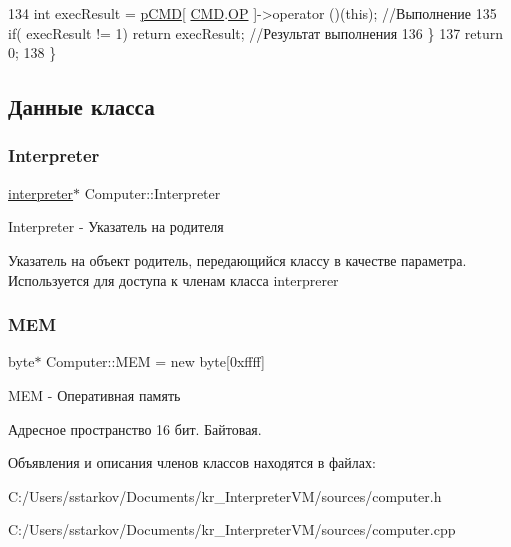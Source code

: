 \begin{DoxyCode}
134         \textcolor{keywordtype}{int} execResult = \hyperlink{class_computer_a297a9b79381a9f2005c574f09ea73d70}{pCMD}[ \hyperlink{class_computer_a8423168f7cc356b4dd36977603798caf}{CMD}.\hyperlink{struct_computer_1_1command_a2714eda12dcfba46770769c7ed9c7f0a}{OP} ]->operator ()(\textcolor{keyword}{this});     \textcolor{comment}{//Выполнение}
135         \textcolor{keywordflow}{if}( execResult != 1) \textcolor{keywordflow}{return} execResult;                 \textcolor{comment}{//Результат выполнения}
136     \}
137     \textcolor{keywordflow}{return} 0;
138 \}
\end{DoxyCode}


\subsection{Данные класса}
\hypertarget{class_computer_aa58d6e565412d6705657c0418b1e59fe}{}\label{class_computer_aa58d6e565412d6705657c0418b1e59fe} 
\subsubsection{\texorpdfstring{Interpreter}{Interpreter}}
{\footnotesize\ttfamily \hyperlink{classinterpreter}{interpreter}$\ast$ Computer\+::\+Interpreter\hspace{0.3cm}{\ttfamily [private]}}



Interpreter -\/ Указатель на родителя 

Указатель на объект родитель, передающийся классу в качестве параметра. Используется для доступа к членам класса interprerer \hypertarget{class_computer_adcd1bd438b7ad95f043db2acbbd864ae}{}\label{class_computer_adcd1bd438b7ad95f043db2acbbd864ae} 
\subsubsection{\texorpdfstring{M\+EM}{MEM}}
{\footnotesize\ttfamily byte$\ast$ Computer\+::\+M\+EM = new byte\mbox{[}0xffff\mbox{]}\hspace{0.3cm}{\ttfamily [private]}}



M\+EM -\/ Оперативная память 

Адресное пространство 16 бит. Байтовая. 

Объявления и описания членов классов находятся в файлах\+:\begin{DoxyCompactItemize}
\item 
C\+:/\+Users/sstarkov/\+Documents/kr\+\_\+\+Interpreter\+V\+M/sources/computer.\+h\item 
C\+:/\+Users/sstarkov/\+Documents/kr\+\_\+\+Interpreter\+V\+M/sources/computer.\+cpp\end{DoxyCompactItemize}

